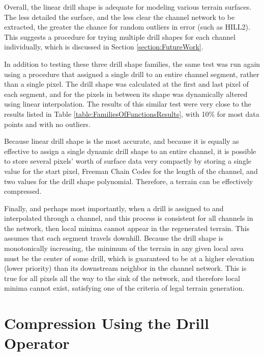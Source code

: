 Overall, the linear drill shape is adequate for modeling various terrain surfaces. The less detailed the surface, and the less clear the channel network to be extracted, the greater the chance for random outliers in error (such as HILL2). This suggests a procedure for trying multiple drill shapes for each channel individually, which is discussed in Section \ref{section:FutureWork}.


In addition to testing these three drill shape families, the same test was run again using a procedure that assigned a single drill to an entire channel segment, rather than a single pixel. The drill shape was calculated at the first and last pixel of each segment, and for the pixels in between its shape was dynamically altered using linear interpolation. The results of this similar test were very close to the results listed in Table \ref{table:FamiliesOfFunctionsResults}, with 10\% for most data points and with no outliers. 

Because linear drill shape is the most accurate, and because it is equally as effective to assign a single dynamic drill shape to an entire channel, it is possible to store several pixels' worth of surface data very compactly by storing a single value for the start pixel, Freeman Chain Codes for the length of the channel, and two values for the drill shape polynomial. Therefore, a terrain can be effectively compressed. 

Finally, and perhaps most importantly, when a drill is assigned to and interpolated through a channel, and this process is consistent for all channels in the network, then local minima cannot appear in the regenerated terrain. This assumes that each segment travels downhill. Because the drill shape is monotonically increasing, the minimum of the terrain in any given local area must be the center of some drill, which is guaranteed to be at a higher elevation (lower priority) than its downstream neighbor in the channel network. This is true for all pixels all the way to the sink of the network, and therefore local minima cannot exist, satisfying one of the criteria of legal terrain generation.

\section{Compression Using the Drill Operator}
\label{section:TerrainCompression}

